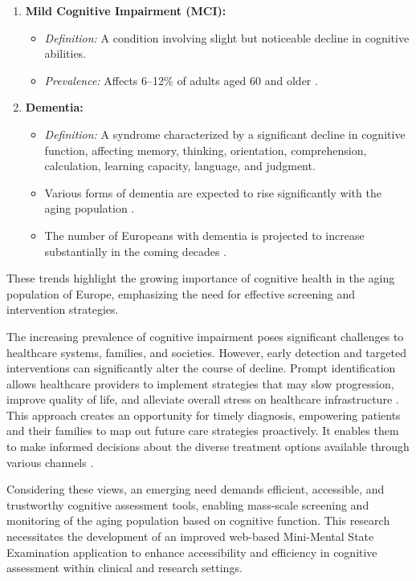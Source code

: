 \begin{enumerate}
    \item \textbf{Mild Cognitive Impairment (MCI):}
    \begin{itemize}
        \item \textit{Definition:} A condition involving slight but noticeable decline in cognitive abilities.
        \item \textit{Prevalence:} Affects 6--12\% of adults aged 60 and older \cite{Petersen2018}.
    \end{itemize}
    
    \item \textbf{Dementia:}
    \begin{itemize}
        \item \textit{Definition:} A syndrome characterized by a significant decline in cognitive function, affecting memory, thinking, orientation, comprehension, calculation, learning capacity, language, and judgment.  
        \item Various forms of dementia are expected to rise significantly with the aging population \cite{Livingston2020}. 
        \item The number of Europeans with dementia is projected to increase substantially in the coming decades \cite{AlzheimerEurope2019}.
    \end{itemize}
\end{enumerate}

These trends highlight the growing importance of cognitive health in the aging population of Europe, emphasizing the need for effective screening and intervention strategies.

The increasing prevalence of cognitive impairment poses significant challenges to healthcare systems, families, and societies. However, early detection and targeted interventions can significantly alter the course of decline. Prompt identification allows healthcare providers to implement strategies that may slow progression, improve quality of life, and alleviate overall stress on healthcare infrastructure \cite{Livingston2020}. This approach creates an opportunity for timely diagnosis, empowering patients and their families to map out future care strategies proactively. It enables them to make informed decisions about the diverse treatment options available through various channels \cite{Sperling2011}.

Considering these views, an emerging need demands efficient, accessible, and trustworthy cognitive assessment tools, enabling mass-scale screening and monitoring of the aging population based on cognitive function. This research necessitates the development of an improved web-based Mini-Mental State Examination application to enhance accessibility and efficiency in cognitive assessment within clinical and research settings.

